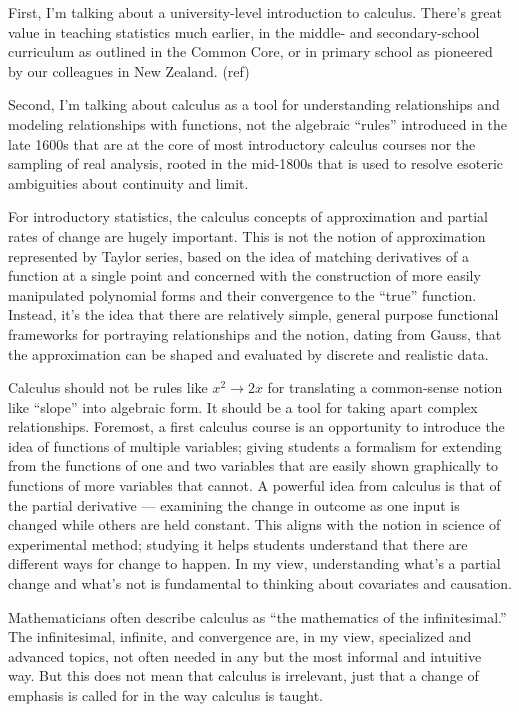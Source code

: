 First, I'm talking about a university-level introduction to calculus.  There's great value in teaching statistics much earlier, in the middle- and secondary-school curriculum as outlined in the Common Core, or in primary school as pioneered by our colleagues in New Zealand. (ref) 

Second, I'm talking about calculus as a tool for understanding relationships and modeling relationships with functions, not the algebraic ``rules'' introduced in the late 1600s that are at the core of most introductory calculus courses nor the sampling of real analysis, rooted in the mid-1800s that is used to resolve esoteric ambiguities about continuity and limit.

For introductory statistics, the calculus concepts of approximation and partial rates of change are hugely important.  This is not the notion of approximation represented by Taylor series, based on the idea of matching derivatives of a function at a single point and concerned with the construction of more easily manipulated polynomial forms and their convergence to the ``true'' function.  Instead, it's the idea that there are relatively simple, general purpose functional frameworks for portraying relationships and the notion, dating from Gauss, that the approximation can be shaped and evaluated by discrete and realistic data.

Calculus should not be rules like $x^2 \rightarrow 2 x$ for translating a common-sense notion like ``slope'' into algebraic form.  It should be a tool for taking apart complex relationships.  Foremost, a first calculus course is an opportunity to introduce the idea of functions of multiple variables; giving students a formalism for extending from the functions of one and two variables that are easily shown graphically to functions of more variables that cannot.  A powerful idea from calculus is that of the partial derivative --- examining the change in outcome as one input is changed while others are held constant.  This aligns with the notion in science of experimental method; studying it helps students understand that there are different ways for change to happen.  In my view, understanding what's a partial change and what's not is fundamental to thinking about covariates and causation.

Mathematicians often describe calculus as ``the mathematics of the infinitesimal.''  
The infinitesimal, infinite, and convergence are, in my view, specialized and advanced topics, not often needed in any but the most informal and intuitive way.  But this does not mean that calculus is irrelevant, just that a change of emphasis is called for in the way calculus is taught.

